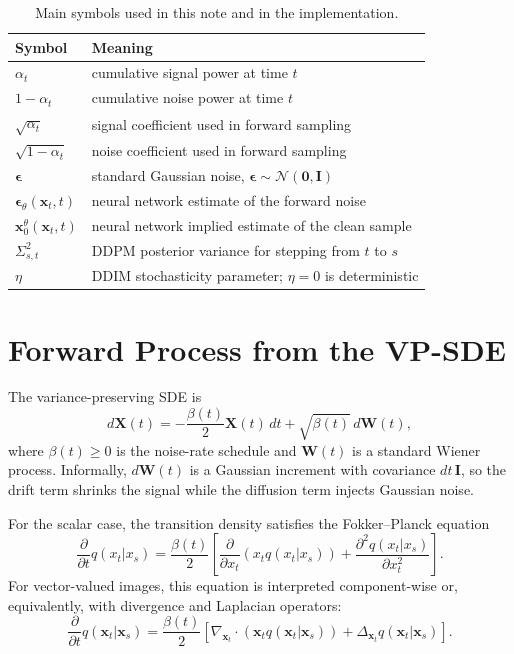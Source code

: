 \documentclass[11pt]{article}
\newcommand{\bx}{\mathbf{x}}
\newcommand{\bX}{\mathbf{X}}
\newcommand{\beps}{\boldsymbol{\epsilon}}
\newcommand{\bW}{\mathbf{W}}
\newcommand{\bI}{\mathbf{I}}
\newcommand{\N}{\mathcal{N}}
\begin{document}
\begin{table}[h]
  \centering
  \caption{Main symbols used in this note and in the implementation.}
  \label{tab:notation}
  \begin{tabular}{ll}
    \toprule
    Symbol & Meaning \\
    \midrule
    $\alpha_t$ & cumulative signal power at time $t$ \\
    $1-\alpha_t$ & cumulative noise power at time $t$ \\
    $\sqrt{\alpha_t}$ & signal coefficient used in forward sampling \\
    $\sqrt{1-\alpha_t}$ & noise coefficient used in forward sampling \\
    $\beps$ & standard Gaussian noise, $\beps \sim \N(\mathbf{0},\bI)$ \\
    $\beps_\theta(\bx_t,t)$ & neural network estimate of the forward noise \\
    $\bx_0^\theta(\bx_t,t)$ & neural network implied estimate of the clean sample \\
    $\Sigma_{s,t}^2$ & DDPM posterior variance for stepping from $t$ to $s$ \\
    $\eta$ & DDIM stochasticity parameter; $\eta=0$ is deterministic \\
    \bottomrule
  \end{tabular}
\end{table}

\section{Forward Process from the VP-SDE}

The variance-preserving SDE is
\begin{equation}
  d\bX(t) = -\frac{\beta(t)}{2}\bX(t)\,dt + \sqrt{\beta(t)}\,d\bW(t),
  \label{eq:vp_sde}
\end{equation}
where $\beta(t)\geq 0$ is the noise-rate schedule and $\bW(t)$ is a standard Wiener process.  Informally,
$d\bW(t)$ is a Gaussian increment with covariance $dt\,\bI$, so the drift term shrinks the signal while
the diffusion term injects Gaussian noise.

For the scalar case, the transition density satisfies the Fokker--Planck equation
\begin{equation}
  \frac{\partial}{\partial t}q(x_t|x_s)
  =
  \frac{\beta(t)}{2}
  \left[
    \frac{\partial}{\partial x_t}\left(x_t q(x_t|x_s)\right)
    +
    \frac{\partial^2 q(x_t|x_s)}{\partial x_t^2}
  \right].
  \label{eq:fokker_planck_scalar}
\end{equation}
For vector-valued images, this equation is interpreted component-wise or, equivalently, with divergence
and Laplacian operators:
\begin{equation}
  \frac{\partial}{\partial t}q(\bx_t|\bx_s)
  =
  \frac{\beta(t)}{2}
  \left[
    \nabla_{\bx_t}\!\cdot\!\left(\bx_t q(\bx_t|\bx_s)\right)
    +
    \Delta_{\bx_t}q(\bx_t|\bx_s)
  \right].
  \label{eq:fokker_planck_vector}
\end{equation}
\end{document}
